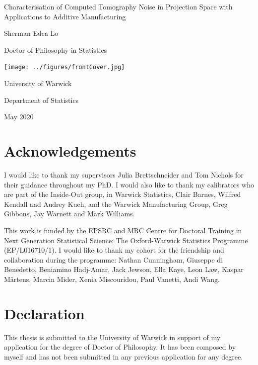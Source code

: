 \documentclass[12pt, a4paper, twoside]{memoir}
\begin{document}
\sloppy

%

\begin{titlingpage}
\centering
{\LARGE Characterisation of Computed Tomography Noise in Projection Space with Applications to Additive Manufacturing \par}
\vspace{1cm}
{\Large Sherman Edea Lo\par}
{\Large Doctor of Philosophy in Statistics\par}
\vfill
\texttt{[image: ../figures/frontCover.jpg]}
\vfill
{\Large University of Warwick\par}
{\Large Department of Statistics\par}
{\Large May 2020\par}
\end{titlingpage}


\frontmatter

\cleardoublepage
\tableofcontents*
\cleardoublepage
\listoffigures
\cleardoublepage
\listoftables

\chapter{Acknowledgements}
I would like to thank my supervisors Julia Brettschneider and Tom Nichols for their guidance throughout my PhD. I would also like to thank my calibrators who are part of the Inside-Out group, in Warwick Statistics, Clair Barnes, Wilfred Kendall and Audrey Kueh, and the Warwick Manufacturing Group, Greg Gibbons, Jay Warnett and Mark Williams.

This work is funded by the EPSRC and MRC Centre for Doctoral Training in Next Generation Statistical Science: The Oxford-Warwick Statistics Programme (EP/L016710/1). I would like to thank my cohort for the friendship and collaboration during the programme: Nathan Cunningham, Giuseppe di Benedetto, Beniamino Hadj-Amar, Jack Jewson, Ella Kaye, Leon Law, Kaspar M\"{a}rtens, Marcin Mider, Xenia Miscouridou, Paul Vanetti, Andi Wang.

\chapter{Declaration}
This thesis is submitted to the University of Warwick in support of my application for the degree of Doctor of Philosophy. It has been composed by myself and has not been submitted in any previous application for any degree.
\end{document}
